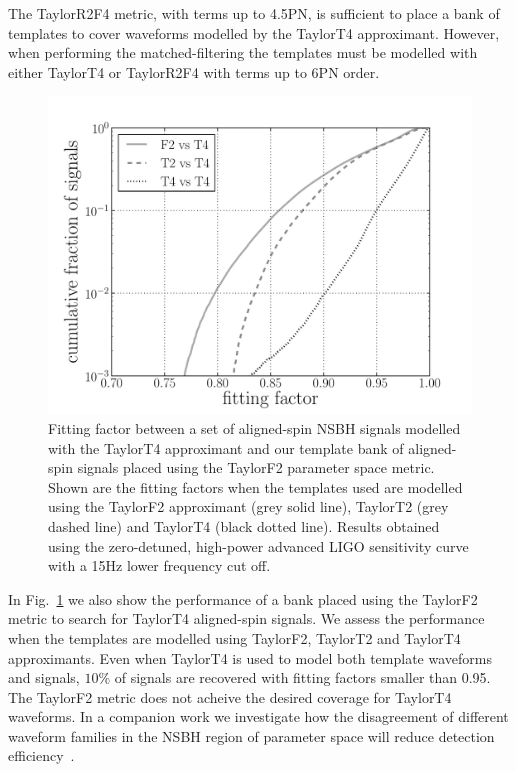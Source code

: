 The TaylorR2F4 metric, with terms up to
4.5\ac{PN}, is sufficient to place
a bank of templates to cover waveforms modelled by the TaylorT4 approximant.
However, when performing the
matched-filtering the templates must be modelled with either TaylorT4 or
TaylorR2F4 with terms up to 6\ac{PN} order.

\begin{figure}
\begin{center}
\includegraphics[width=1.0\textwidth]
{papers/nsbh_effectualness/figure5.pdf}
\end{center}
\caption{\label{fig:bankF2T4testing}
Fitting factor between a set of aligned-spin \ac{NSBH} signals modelled with the
TaylorT4 approximant and our template bank of aligned-spin signals placed using
the TaylorF2 parameter space metric. Shown are the fitting factors when the
templates used are modelled using the TaylorF2 approximant (grey solid line),
TaylorT2 (grey dashed line) and TaylorT4 (black dotted line). Results obtained
using the zero-detuned, high-power advanced LIGO sensitivity curve with a 15Hz
lower frequency cut off.
}
\end{figure}

In Fig.~\ref{fig:bankF2T4testing} we also show the performance of a bank
placed using the TaylorF2 metric to search for TaylorT4 aligned-spin signals.
We assess the performance when the templates are modelled using TaylorF2,
TaylorT2 and TaylorT4 approximants. Even when TaylorT4 is used to model both
template waveforms and signals, $10\%$ of signals are recovered with fitting
factors smaller than 0.95. The TaylorF2 metric does not acheive the desired
coverage for TaylorT4 waveforms. In a companion work we investigate how the 
disagreement of different waveform families in the \ac{NSBH} region of 
parameter space will reduce detection efficiency~\cite{Nitz:2013mxa}.

